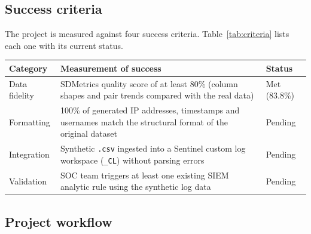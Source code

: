 \documentclass[11pt,a4paper]{article}
\begin{document}
\subsection{Success criteria}
The project is measured against four success criteria. Table~\ref{tab:criteria} lists each one with its current status.

\begin{table}[H]
\centering
\begin{tabular}{@{}p{2.4cm}p{7.2cm}p{2cm}@{}}
\toprule
Category & Measurement of success & Status\\
\midrule
Data fidelity & SDMetrics quality score of at least 80\% (column shapes and pair trends compared with the real data) & Met (83.8\%)\\
Formatting & 100\% of generated IP addresses, timestamps and usernames match the structural format of the original dataset & Pending\\
Integration & Synthetic \texttt{.csv} ingested into a Sentinel custom log workspace (\texttt{\_CL}) without parsing errors & Pending\\
Validation & SOC team triggers at least one existing SIEM analytic rule using the synthetic log data & Pending\\
\bottomrule
\end{tabular}
\end{table}


\subsection{Project workflow}
\end{document}

